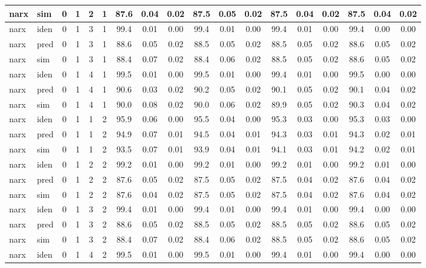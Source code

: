 \begin{landscape}
\begin{center}
\begin{longtable}{ll|cccc|ccc|ccc|ccc|ccc}
narx & sim  & 0 & 1 & 2 & 1 & 87.6 & 0.04 & 0.02 & 87.5 & 0.05 & 0.02 & 87.5 & 0.04 & 0.02 & 87.5 & 0.04 & 0.02 \\ 
 \hline 
narx & iden & 0 & 1 & 3 & 1 & 99.4 & 0.01 & 0.00 & 99.4 & 0.01 & 0.00 & 99.4 & 0.01 & 0.00 & 99.4 & 0.00 & 0.00 \\ 
narx & pred & 0 & 1 & 3 & 1 & 88.6 & 0.05 & 0.02 & 88.5 & 0.05 & 0.02 & 88.5 & 0.05 & 0.02 & 88.6 & 0.05 & 0.02 \\ 
narx & sim  & 0 & 1 & 3 & 1 & 88.4 & 0.07 & 0.02 & 88.4 & 0.06 & 0.02 & 88.5 & 0.05 & 0.02 & 88.6 & 0.05 & 0.02 \\ 
 \hline 
narx & iden & 0 & 1 & 4 & 1 & 99.5 & 0.01 & 0.00 & 99.5 & 0.01 & 0.00 & 99.4 & 0.01 & 0.00 & 99.5 & 0.00 & 0.00 \\ 
narx & pred & 0 & 1 & 4 & 1 & 90.6 & 0.03 & 0.02 & 90.2 & 0.05 & 0.02 & 90.1 & 0.05 & 0.02 & 90.1 & 0.04 & 0.02 \\ 
narx & sim  & 0 & 1 & 4 & 1 & 90.0 & 0.08 & 0.02 & 90.0 & 0.06 & 0.02 & 89.9 & 0.05 & 0.02 & 90.3 & 0.04 & 0.02 \\ 
 \hline 
narx & iden & 0 & 1 & 1 & 2 & 95.9 & 0.06 & 0.00 & 95.5 & 0.04 & 0.00 & 95.3 & 0.03 & 0.00 & 95.3 & 0.03 & 0.00 \\ 
narx & pred & 0 & 1 & 1 & 2 & 94.9 & 0.07 & 0.01 & 94.5 & 0.04 & 0.01 & 94.3 & 0.03 & 0.01 & 94.3 & 0.02 & 0.01 \\ 
narx & sim  & 0 & 1 & 1 & 2 & 93.5 & 0.07 & 0.01 & 93.9 & 0.04 & 0.01 & 94.1 & 0.03 & 0.01 & 94.2 & 0.02 & 0.01 \\ 
 \hline 
narx & iden & 0 & 1 & 2 & 2 & 99.2 & 0.01 & 0.00 & 99.2 & 0.01 & 0.00 & 99.2 & 0.01 & 0.00 & 99.2 & 0.01 & 0.00 \\ 
narx & pred & 0 & 1 & 2 & 2 & 87.6 & 0.05 & 0.02 & 87.5 & 0.05 & 0.02 & 87.5 & 0.04 & 0.02 & 87.6 & 0.04 & 0.02 \\ 
narx & sim  & 0 & 1 & 2 & 2 & 87.6 & 0.04 & 0.02 & 87.5 & 0.05 & 0.02 & 87.5 & 0.04 & 0.02 & 87.6 & 0.04 & 0.02 \\ 
 \hline 
narx & iden & 0 & 1 & 3 & 2 & 99.4 & 0.01 & 0.00 & 99.4 & 0.01 & 0.00 & 99.4 & 0.01 & 0.00 & 99.4 & 0.00 & 0.00 \\ 
narx & pred & 0 & 1 & 3 & 2 & 88.6 & 0.05 & 0.02 & 88.5 & 0.05 & 0.02 & 88.5 & 0.05 & 0.02 & 88.6 & 0.05 & 0.02 \\ 
narx & sim  & 0 & 1 & 3 & 2 & 88.4 & 0.07 & 0.02 & 88.4 & 0.06 & 0.02 & 88.5 & 0.05 & 0.02 & 88.6 & 0.05 & 0.02 \\ 
 \hline 
narx & iden & 0 & 1 & 4 & 2 & 99.5 & 0.01 & 0.00 & 99.5 & 0.01 & 0.00 & 99.4 & 0.01 & 0.00 & 99.4 & 0.00 & 0.00 \\ 

\end{longtable}
\end{center}
\end{landscape}
